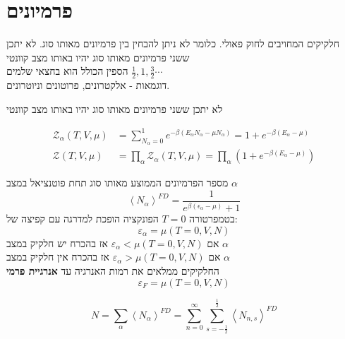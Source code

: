 \section{פרמיונים}
חלקיקים המחויבים לחוק פאולי. כלומר לא ניתן להבחין בין פרמיונים מאותו סוג. 
לא יתכן ששני פרמיונים מאותו סוג יהיו באותו מצב קוונטי\\הספין הכולל הוא בחצאי שלמים $\tfrac{1}{2},1,\tfrac{3}{2}\cdots$\\
דוגמאות - אלקטרונים, פרוטונים וניוטרונים.

\begin{cheatformula}
לא יתכן ששני פרמיונים מאותו סוג יהיו באותו מצב קוונטי
\end{cheatformula}

\begin{cheatformula}
    \begin{align*}
    \mathcal{Z}_\alpha \left(T,V,\mu\right) &= \sum_{N_\alpha = 0}^1 e^{-\beta \left( E_\alpha N_\alpha - \mu N_\alpha \right)} = 1 + e^{-\beta \left( E_\alpha - \mu \right)} \\
    \mathcal{Z} \left(T,V,\mu\right) &= \prod_\alpha \mathcal{Z}_\alpha \left(T,V,\mu\right) = \prod_\alpha \left( 1 + e^{-\beta \left( E_\alpha - \mu \right)} \right)
    \end{align*}
\end{cheatformula}

\begin{cheatformula}
מספר הפרמיונים הממוצע מאותו סוג תחת פוטנציאל במצב $\alpha$ 
    $$\left<N_\alpha \right>^{FD} = \frac{1}{e^{\beta \left(\epsilon_\alpha -\mu \right) }+1}$$
בטמפרטורה $T=0$ הפונקציה הופכת למדרגה עם קפיצה של:
$$\varepsilon_\alpha = \mu \left(T=0, V, N\right)$$
אם $\varepsilon_\alpha < \mu \left(T=0, V,N\right)$ אז בהכרח יש חלקיק במצב $\alpha$
\\
אם $\varepsilon_\alpha > \mu \left(T=0, V,N\right)$ אז בהכרח אין חלקיק במצב $\alpha$
\\
החלקיקים ממלאים את רמות האנרגיה עד \textbf{אנרגיית פרמי}
$$\varepsilon_F = \mu \left(T=0, V,N\right)$$
\end{cheatformula}

\begin{cheatformula}
$$N = \sum_\alpha \left< N_\alpha \right>^{FD} = \sum_{n=0}^{\infty} \sum_{s=-\frac{1}{2}}^{\frac{1}{2}} \left< N_{n,s} \right>^{FD}$$
\end{cheatformula}

